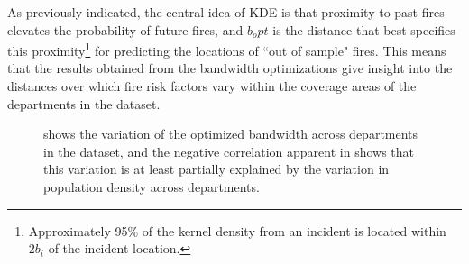 \documentclass{svjour3}
\begin{document}
 As previously indicated, the central idea of KDE is that proximity to past fires elevates the probability of future fires, and $b_opt$ is the distance that best specifies this proximity\footnote{Approximately 95\% of the kernel density from an incident is located within $2b_i$ of the incident location.} for predicting the locations of ``out of sample" fires. This means that the results obtained from the bandwidth optimizations give insight into the distances over which fire risk factors vary within the coverage areas of the departments in the dataset.

\begin{figure}[!htb]
       \begin{center}
      \end{center}
      \caption{\protect{} shows the variation of the optimized bandwidth across departments in the dataset, and the negative correlation apparent in \protect{} shows that this variation is at least partially explained by the variation in population density across departments.}
     \label{fig:band_optimization}
  \end{figure}
  
\end{document}
